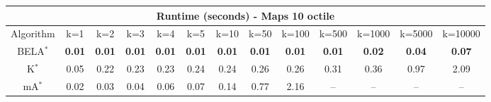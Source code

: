 \begin{tabular}{c|cccccccccccc}\toprule
\multicolumn{13}{c}{Runtime (seconds) - Maps 10 octile}\\ \midrule
Algorithm & k=1 & k=2 & k=3 & k=4 & k=5 & k=10 & k=50 & k=100 & k=500 & k=1000 & k=5000 & k=10000 \\ \midrule
BELA$^*$ & \textbf{0.01} & \textbf{0.01} & \textbf{0.01} & \textbf{0.01} & \textbf{0.01} & \textbf{0.01} & \textbf{0.01} & \textbf{0.01} & \textbf{0.01} & \textbf{0.02} & \textbf{0.04} & \textbf{0.07} \\
K$^*$ & 0.05 & 0.22 & 0.23 & 0.23 & 0.24 & 0.24 & 0.26 & 0.26 & 0.31 & 0.36 & 0.97 & 2.09 \\
mA$^*$ & 0.02 & 0.03 & 0.04 & 0.06 & 0.07 & 0.14 & 0.77 & 2.16 & -- & -- & -- & -- \\ \bottomrule 
\end{tabular}
